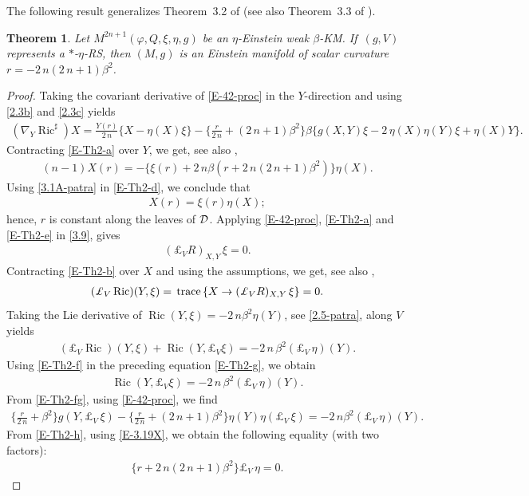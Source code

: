 \documentclass[11pt,a4paper,twoside]{article}
\newtheorem{theorem}{Theorem}%
\def\Ric{\operatorname{Ric}}
\def\tr{{\rm\,trace\,}}
\begin{document}
{The following result generalizes Theorem~3.2 of \cite{ven-2019} (see also Theorem~3.3 of \cite{ven-2022}).

\begin{theorem}%
Let $M^{2n+1}(\varphi,Q,\xi,\eta,g)$ be an $\eta$-Einstein weak $\beta$-KM.
If~$(g,V)$ represents a $\ast$-$\eta$-RS, then $(M,g)$ is an Einstein manifold of scalar curvature ${r}=-2\,n(2\,n+1)\beta^2$.
\end{theorem}

\begin{proof}
Taking the covariant derivative of \eqref{E-42-proc} in the $Y$-direction and using \eqref{2.3b} and \eqref{2.3c} yields
\begin{align}\label{E-Th2-a}
 (\nabla_Y\Ric^\sharp)X = \frac{Y({r})}{2\,n}\{X-\eta(X)\xi\}
 -\big\{\frac{r}{2\,n}+(2\,n+1)\beta^2\big\}\beta\{g(X,Y)\xi -2\,\eta(X)\eta(Y)\xi +\eta(X)Y\}.
\end{align}
Contracting \eqref{E-Th2-a} over $Y$, we get, see also \cite{rov-126},
\begin{align}\label{E-Th2-d}
 (n-1)X({r}) = -\{\xi({r}) + 2\,n\beta({r}+2\,n(2\,n+1)\beta^2)\}\eta(X) .
\end{align}
Using \eqref{3.1A-patra} in \eqref{E-Th2-d}, we conclude that
\begin{align}\label{E-Th2-e}
 X({r}) = \xi({r})\eta(X) ;
\end{align}
hence, ${r}$ is constant along the leaves of ${\cal D}$.
Applying \eqref{E-42-proc}, \eqref{E-Th2-a} and \eqref{E-Th2-e} in \eqref{3.9}, gives
\begin{align}\label{E-Th2-b}
 (\pounds_V R)_{X,Y}\,\xi = 0 .
\end{align}
Contracting \eqref{E-Th2-b} over $X$ and using the assumptions, we get, see also \cite{rov-126},
\begin{align}\label{E-Th2-f}
 (\pounds_V \Ric)(Y,\xi) = \tr\{X \to (\pounds_V R)_{X,Y}\,\xi\} = 0.
\end{align}
Taking the Lie derivative of $\Ric(Y,\xi) = -2\,n\beta^2\eta(Y)$, see \eqref{2.5-patra}, along $V$ yields
\begin{align}\label{E-Th2-g}
 (\pounds_V \Ric)(Y,\xi) + \Ric(Y,\pounds_V\xi) = -2\,n\,\beta^2(\pounds_V\,\eta)(Y) .
\end{align}
Using \eqref{E-Th2-f} in the preceding equation \eqref{E-Th2-g}, we obtain
\begin{align}\label{E-Th2-fg}
 \Ric(Y,\pounds_V\xi) = -2\,n\,\beta^2(\pounds_V\,\eta)(Y) .
\end{align}
From \eqref{E-Th2-fg}, using \eqref{E-42-proc}, we find
\begin{align}\label{E-Th2-h}
 \big\{\frac{r}{2\,n} + \beta^2\big\} g(Y,\pounds_V\,\xi) - \big\{\frac{r}{2\,n} + (2\,n+1)\beta^2\big\}\eta(Y)\eta(\pounds_V\,\xi)
 =
 - 2\,n\beta^2(\pounds_V\,\eta)(Y) .
\end{align}
From \eqref{E-Th2-h}, using \eqref{E-3.19X}, we obtain the following equality (with two factors):
\begin{align}\label{E-Th2-i}
 \big\{{r} + 2\,n(2\,n+1)\beta^2\big\}\pounds_V\,\eta = 0 .
\end{align}


\end{proof}}
\end{document}
